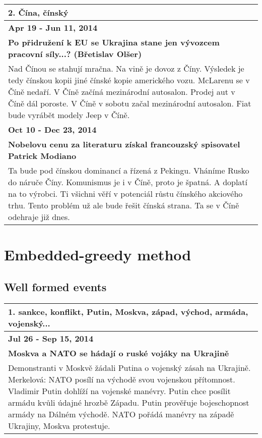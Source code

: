 \hspace{\fill}

\begin{tabularx}{\linewidth}{p{\linewidth}} \toprule[1.5pt]
\bf 2. Čína, čínský \\ \midrule
\bf Apr 19 - Jun 11, 2014 \\ \midrule
\bf Po přidružení k EU se Ukrajina stane jen vývozcem pracovní síly...? (Břetislav Olšer) \\
Nad Čínou se stahují mračna. Na vině je dovoz z Číny. Výsledek je tedy čínskou kopii jiné čínské kopie amerického vozu. McLarenu se v Číně nedaří. V Číně začíná mezinárodní autosalon. Prodej aut v Číně dál poroste. V Číně v sobotu začal mezinárodní autosalon. Fiat bude vyrábět modely Jeep v Číně. \\ \bottomrule[1.25pt]

\bf Oct 10 - Dec 23, 2014 \\ \midrule
\bf Nobelovu cenu za literaturu získal francouzský spisovatel Patrick Modiano \\
Ta bude pod čínskou dominancí a řízená z Pekingu. Vháníme Rusko do náruče Číny. Komunismus je i v Číně, proto je špatná. A doplatí na to výrobci. Ti všichni věří v potenciál růstu čínského akciového trhu. Tento problém už ale bude řešit čínská strana. Ta se v Číně odehraje již dnes. \\ \bottomrule[1.25pt]

\end{tabularx}

\hspace{\fill}


\section{Embedded-greedy method}
\subsection*{Well formed events}

\hspace{\fill}

\begin{tabularx}{\linewidth}{p{\linewidth}} \toprule[1.5pt]
\bf 1. sankce, konflikt, Putin, Moskva, západ, východ, armáda, vojenský... \\ \midrule
\bf Jul 26 - Sep 15, 2014 \\ \midrule
\bf Moskva a NATO se hádají o ruské vojáky na Ukrajině \\
Demonstranti v Moskvě žádali Putina o vojenský zásah na Ukrajině. Merkelová: NATO posílí na východě svou vojenskou přítomnost. Vladimir Putin dohlíží na vojenské manévry. Putin chce posílit armádu kvůli údajné hrozbě Západu. Putin prověřuje bojeschopnost armády na Dálném východě. NATO pořádá manévry na západě Ukrajiny, Moskva protestuje. \\ \bottomrule[1.25pt]

\end{tabularx}

